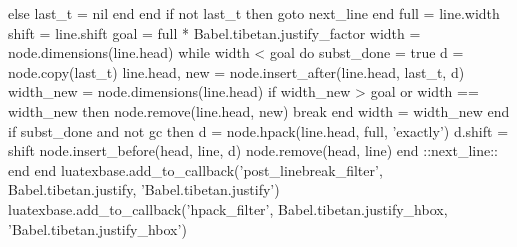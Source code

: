 {{          else
            last_t = nil
          end
        end
        if not last_t then goto next_line end
        full  = line.width
        shift = line.shift
        goal  = full * Babel.tibetan.justify_factor %
        width = node.dimensions(line.head)    %
        while width < goal do
          subst_done = true
          d = node.copy(last_t)
          line.head, new = node.insert_after(line.head, last_t, d)
          width_new = node.dimensions(line.head)
          if width_new > goal or width == width_new then
            node.remove(line.head, new) %
            break
          end
          width = width_new
        end
        if subst_done and not gc then
          d = node.hpack(line.head, full, 'exactly')
          d.shift = shift
          node.insert_before(head, line, d)
          node.remove(head, line)
        end
        ::next_line::
      end %
    end
    luatexbase.add_to_callback('post_linebreak_filter',
      Babel.tibetan.justify, 'Babel.tibetan.justify')
    luatexbase.add_to_callback('hpack_filter',
      Babel.tibetan.justify_hbox, 'Babel.tibetan.justify_hbox')
  }}
  
\fi

\endinput